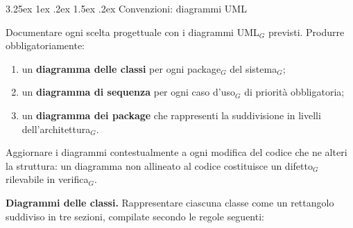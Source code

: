 \documentclass[a4paper, 10pt]{article}
\makeatletter
\renewcommand\paragraph{\@startsection{paragraph}{4}{\z@}%
  {3.25ex \@plus1ex \@minus .2ex}%
  {1.5ex \@plus .2ex}%
  {\normalfont\normalsize\bfseries}}
\makeatother
\begin{document}
\paragraph{Convenzioni: diagrammi UML}

Documentare ogni scelta progettuale con i diagrammi UML$_G$ previsti. Produrre obbligatoriamente:
\begin{enumerate}
    \item un \textbf{diagramma delle classi} per ogni package$_G$ del sistema$_G$;
    \item un \textbf{diagramma di sequenza} per ogni caso d'uso$_G$ di priorità obbligatoria;
    \item un \textbf{diagramma dei package} che rappresenti la suddivisione in livelli dell'architettura$_G$.
\end{enumerate}

\noindent Aggiornare i diagrammi contestualmente a ogni modifica del codice che ne alteri la struttura: un diagramma non allineato al codice costituisce un difetto$_G$ rilevabile in verifica$_G$.

\textbf{Diagrammi delle classi.} Rappresentare ciascuna classe come un rettangolo suddiviso in tre sezioni, compilate secondo le regole seguenti:
\end{document}
